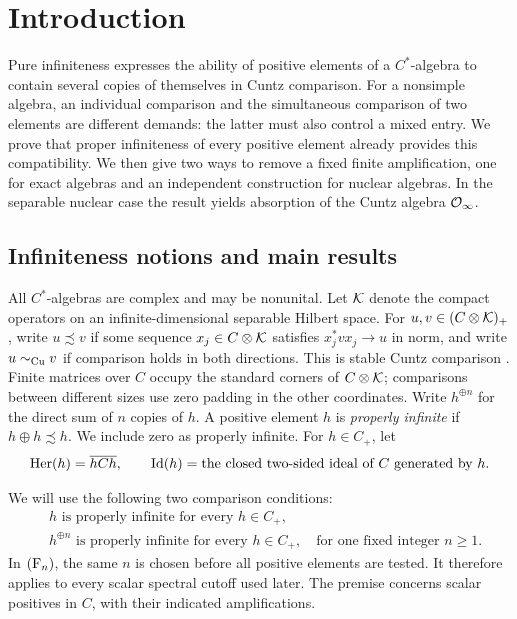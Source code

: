 \section{Introduction}\label{sec:introduction}

Pure infiniteness expresses the ability of positive elements of a
\(C^*\)-algebra to contain several copies of themselves in Cuntz
comparison.  For a nonsimple algebra, an individual comparison and
the simultaneous comparison of two elements are different demands:
the latter must also control a mixed entry.  We prove that proper
infiniteness of every positive element already provides this
compatibility.  We then give two ways to remove a fixed finite
amplification, one for exact algebras and an independent construction
for nuclear algebras.  In the separable nuclear case the result yields
absorption of the Cuntz algebra \(\mathcal O_\infty\).

\subsection{Infiniteness notions and main results}

All \(C^*\)-algebras are complex and may be nonunital.  Let \(\mathcal K\)
denote the compact operators on an infinite-dimensional separable
Hilbert space.  For \(u,v\in(C\otimes\mathcal K)_+\), write \(u\precsim v\)
if some sequence \(x_j\in C\otimes\mathcal K\) satisfies
\(x_j^*vx_j\to u\) in norm, and write \(u\sim_{\mathrm{Cu}} v\) if comparison holds
in both directions.  This is stable Cuntz comparison
\cite{Cuntz1978}.  Finite matrices over \(C\) occupy the standard
corners of \(C\otimes\mathcal K\); comparisons between different sizes use
zero padding in the other coordinates.  Write \(h^{\oplus n}\) for
the direct sum of \(n\) copies of \(h\).  A positive element \(h\) is
\emph{properly infinite} if \(h\oplus h\precsim h\).  We include zero
as properly infinite.  For \(h\in C_+\), let
\[
 \operatorname{Her}(h)=\overline{hCh},\qquad
 \operatorname{Id}(h)=\text{the closed two-sided ideal of \(C\) generated by \(h\)}.
\]

We will use the following two comparison conditions:
\begin{align}
 &h\text{ is properly infinite for every }h\in C_+,
 \tag{P}\label{eq:property-P}\\
 &h^{\oplus n}\text{ is properly infinite for every }h\in C_+,
 \quad\text{for one fixed integer }n\ge1.
 \tag{\(F_n\)}\label{eq:property-F}
\end{align}
In \(\textup{(F\ensuremath{_n})}\), the same \(n\) is chosen before all positive elements
are tested.  It therefore applies to every scalar spectral cutoff
used later.  The premise concerns scalar positives in \(C\), with
their indicated amplifications.

